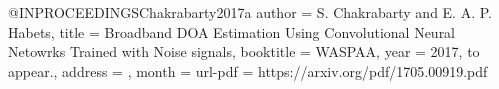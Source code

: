 @INPROCEEDINGS{Chakrabarty2017a
	author = {S. Chakrabarty and E. A. P. Habets},
	title = {Broadband DOA Estimation Using Convolutional Neural Netowrks Trained with Noise signals},
	booktitle = WASPAA,
	year = {2017, to appear.},
	address = {},
	month = {}
	url-pdf = {https://arxiv.org/pdf/1705.00919.pdf}
}

